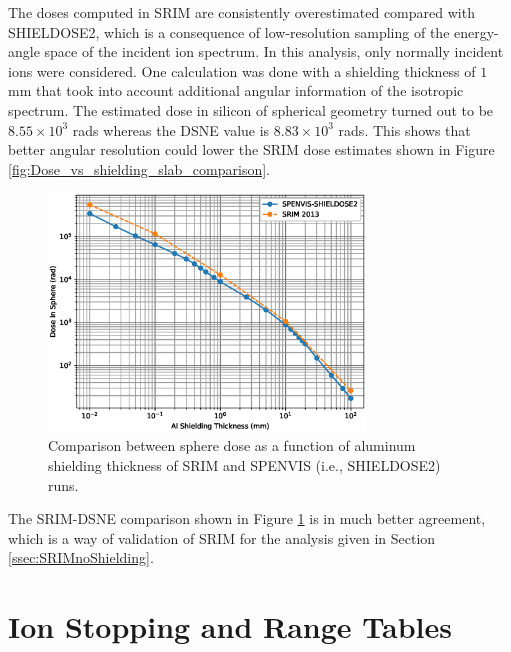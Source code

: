 \documentclass{hitec}
\begin{document}
The doses computed in SRIM are consistently overestimated compared with SHIELDOSE2, which is a consequence of low-resolution sampling of the energy-angle space of the incident ion spectrum. In this analysis, only normally incident ions were considered. One calculation was done with a shielding thickness of $1$ mm that took into account additional angular information of the isotropic spectrum. The estimated dose in silicon of spherical geometry turned out to be $8.55\times 10^{3}$ rads whereas the DSNE value is $8.83\times 10^{3}$ rads. This shows that better angular resolution could lower the SRIM dose estimates shown in Figure \ref{fig:Dose_vs_shielding_slab_comparison}.

\begin{figure}[h!]
	\centering
	\includegraphics[width=0.75\textwidth]{Dose_vs_shielding_sphere_comparison.eps}
	\caption{Comparison between sphere dose as a function of aluminum shielding thickness of SRIM and SPENVIS (i.e., SHIELDOSE2) runs.}\label{fig:Dose_vs_shielding_sphere_comparison}
\end{figure}

The SRIM-DSNE comparison shown in Figure \ref{fig:Dose_vs_shielding_sphere_comparison} is in much better agreement, which is a way of validation of SRIM for the analysis given in Section \ref{ssec:SRIMnoShielding}.


\appendix
{}
\section{Ion Stopping and Range Tables}
\label{asec:IonStoppingRangeTables}
\end{document}
